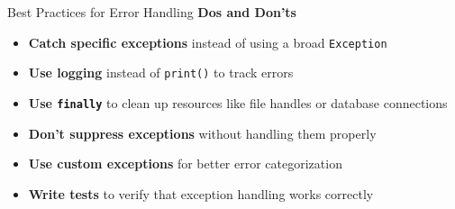 \documentclass[aspectratio=169]{beamer}
\begin{document}
\begin{frame}{Best Practices for Error Handling}
    \textbf{Dos and Don'ts}
    \begin{itemize}[<+->]
        \item \textbf{Catch specific exceptions} instead of using a broad \texttt{Exception}
        \item \textbf{Use logging} instead of \texttt{print()} to track errors
        \item \textbf{Use \texttt{finally}} to clean up resources like file handles or database connections
        \item \textbf{Don't suppress exceptions} without handling them properly
        \item \textbf{Use custom exceptions} for better error categorization
        \item \textbf{Write tests} to verify that exception handling works correctly
    \end{itemize}
\end{frame}

\maketitle
\end{document}
